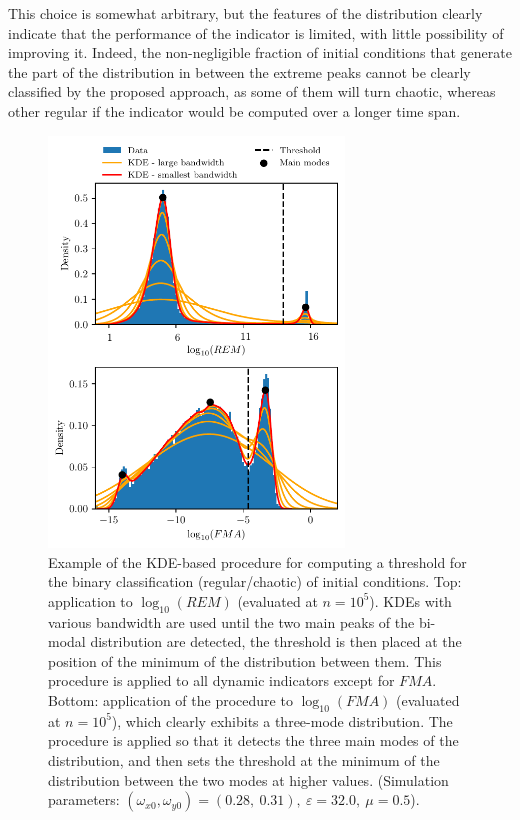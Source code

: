 This choice is somewhat arbitrary, but the features of the distribution clearly indicate that the performance of the indicator is limited, with little possibility of improving it. Indeed, the non-negligible fraction of initial conditions that generate the part of the distribution in between the extreme peaks cannot be clearly classified by the proposed approach, as some of them will turn chaotic, whereas other regular if the indicator would be computed over a longer time span.  

\begin{figure}[htp]
    \centering
    \includegraphics[width=0.7\textwidth]{6_dynamic_indicators/fig/edited_edited_thresholds.pdf}
    \caption{Example of the KDE-based procedure for computing a threshold for the binary classification (regular/chaotic) of initial conditions. Top: application to $\log_{10}(REM)$ (evaluated at $n=10^5$). KDEs with various bandwidth are used until the two main peaks of the bi-modal distribution are detected, the threshold is then placed at the position of the minimum of the distribution between them. This procedure is applied to all dynamic indicators except for $FMA$. Bottom: application of the procedure to $\log_{10}(FMA)$ (evaluated at $n=10^5$), which clearly exhibits a three-mode distribution. The procedure is applied so that it detects the three main modes of the distribution, and then sets the threshold at the minimum of the distribution between the two modes at higher values. (Simulation parameters:  $(\omega_{x0},\omega_{y0})= (0.28,\ 0.31),\ \varepsilon=32.0,\ \mu=0.5$).}
    \label{fig:thresholds}
\end{figure}


